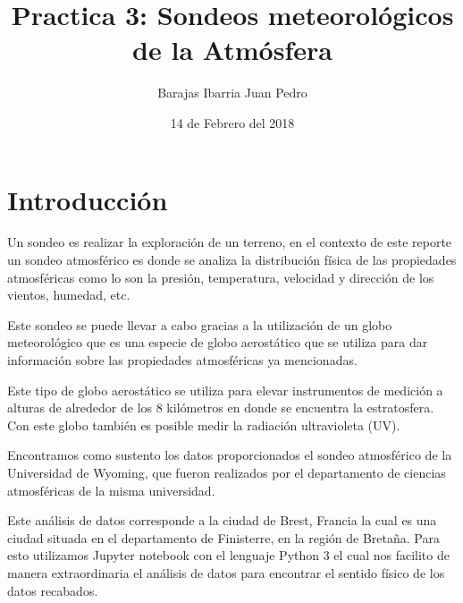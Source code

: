 \documentclass[12pt]{article}
\begin{document}
    \title{Practica 3: Sondeos meteorológicos de la Atmósfera}
    \author{Barajas Ibarria Juan Pedro}
    \date{14 de Febrero del 2018}
    \maketitle 
    
   \section{Introducción}
		Un sondeo es realizar la exploración de un terreno, en el contexto de este reporte un sondeo atmosférico es donde se analiza la distribución física de las propiedades atmosféricas como lo son la presión, temperatura, velocidad y dirección de los vientos, humedad, etc.  ~\cite{Sondeo:Misc}\par 
        Este sondeo se puede llevar a cabo gracias a la utilización de un globo meteorológico que es una especie de globo aerostático que se utiliza para dar información sobre las propiedades atmosféricas ya mencionadas.~\cite{Globo:Misc}\par
        Este tipo de globo aerostático se utiliza para elevar instrumentos de medición a alturas de alrededor de los 8 kilómetros en donde se encuentra la estratosfera. Con este globo también es posible medir la radiación ultravioleta (UV). \par
    Encontramos como sustento los datos proporcionados el sondeo atmosférico de la Universidad de Wyoming, que fueron realizados por el departamento de ciencias atmosféricas de la misma universidad.\par
    Este análisis de datos corresponde a la ciudad de Brest, Francia la cual es una ciudad situada en el departamento de Finisterre, en la región de Bretaña. Para esto utilizamos Jupyter notebook con el lenguaje Python 3 el cual nos facilito de manera extraordinaria el análisis de datos para encontrar el sentido físico de los datos recabados. 
   
\end{document}
